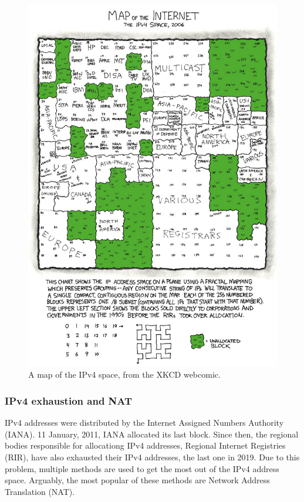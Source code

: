\begin{figure}
    \centering
    \includegraphics[scale=4]{Figurer/map_of_the_internet.jpg}
    \caption{A map of the IPv4 space, from the XKCD webcomic. \cite{xkcd} }
    \label{fig:ipv4_map}
\end{figure}

\subsubsection{IPv4 exhaustion and NAT}
IPv4 addresses were distributed by the Internet Assigned Numbers Authority (IANA). 11 January, 2011, IANA allocated its last block.\cite{exhasuted_IPV4} Since then, the regional bodies responsible for allocationg IPv4 addresses, Regional Internet Registries (RIR), have also exhausted their IPv4 addresses, the last one in 2019.\cite{exhausted_RIPENNC} Due to this problem, multiple methods are used to get the most out of the IPv4 address space. Arguably, the most popular of these methods are Network Address Translation (NAT).


